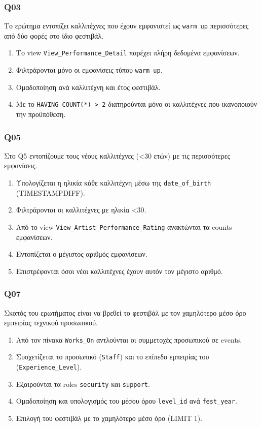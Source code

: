 \documentclass[13pt]{extarticle}
\begin{document}
\subsubsection{Q03}

Το ερώτημα εντοπίζει καλλιτέχνες που έχουν εμφανιστεί ως \texttt{warm up} περισσότερες από δύο φορές στο ίδιο φεστιβάλ.

\begin{enumerate}
    \item Το view \texttt{View\_Performance\_Detail} παρέχει πλήρη δεδομένα εμφανίσεων.
    \item Φιλτράρονται μόνο οι εμφανίσεις τύπου \texttt{warm up}.
    \item Ομαδοποίηση ανά καλλιτέχνη και έτος φεστιβάλ.
    \item Με το \texttt{HAVING COUNT(*) > 2} διατηρούνται μόνο οι καλλιτέχνες που ικανοποιούν την προϋπόθεση.
\end{enumerate}

\subsubsection{Q05}

Στο Q5 εντοπίζουμε τους νέους καλλιτέχνες (<30 ετών) με τις περισσότερες εμφανίσεις.

\begin{enumerate}
    \item Υπολογίζεται η ηλικία κάθε καλλιτέχνη μέσω της \texttt{date\_of\_birth} (TIMESTAMPDIFF).
    \item Φιλτράρονται οι καλλιτέχνες με ηλικία <30.
    \item Από το view \texttt{View\_Artist\_Performance\_Rating} ανακτώνται τα counts εμφανίσεων.
    \item Εντοπίζεται ο μέγιστος αριθμός εμφανίσεων.
    \item Επιστρέφονται όσοι νέοι καλλιτέχνες έχουν αυτόν τον μέγιστο αριθμό.
\end{enumerate}

\subsubsection{Q07}

Σκοπός του ερωτήματος είναι να βρεθεί το φεστιβάλ με τον χαμηλότερο μέσο όρο εμπειρίας τεχνικού προσωπικού.

\begin{enumerate}
    \item Από τον πίνακα \texttt{Works\_On} αντλούνται οι συμμετοχές προσωπικού σε events.
    \item Συσχετίζεται το προσωπικό (\texttt{Staff}) και το επίπεδο εμπειρίας του (\texttt{Experience\_Level}).
    \item Εξαιρούνται τα roles \texttt{security} και \texttt{support}.
    \item Ομαδοποίηση και υπολογισμός του μέσου όρου \texttt{level\_id} ανά \texttt{fest\_year}.
    \item Επιλογή του φεστιβάλ με το χαμηλότερο μέσο όρο (LIMIT 1).
\end{enumerate}
\end{document}
